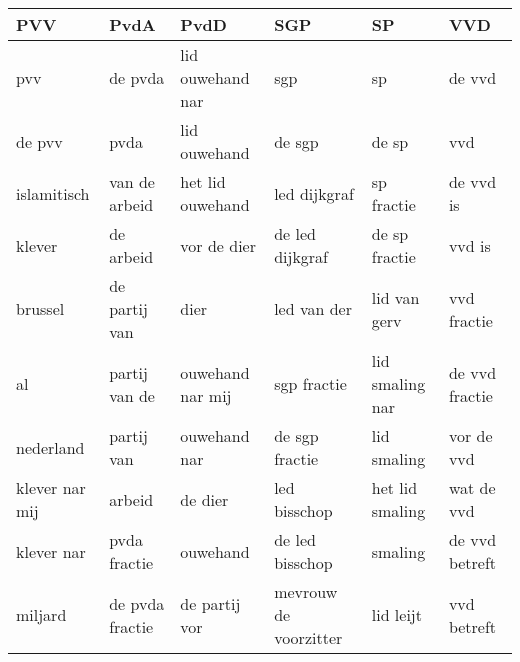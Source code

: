 \begin{tabular}{llllll}
\toprule
            PVV &             PvdA &              PvdD &                    SGP &               SP &             VVD \\
\midrule
            pvv &          de pvda &  lid ouwehand nar &                    sgp &               sp &          de vvd \\
         de pvv &             pvda &      lid ouwehand &                 de sgp &            de sp &             vvd \\
    islamitisch &    van de arbeid &  het lid ouwehand &           led dijkgraf &       sp fractie &       de vvd is \\
         klever &        de arbeid &       vor de dier &        de led dijkgraf &    de sp fractie &          vvd is \\
        brussel &    de partij van &              dier &            led van der &     lid van gerv &     vvd fractie \\
             al &    partij van de &  ouwehand nar mij &            sgp fractie &  lid smaling nar &  de vvd fractie \\
      nederland &       partij van &      ouwehand nar &         de sgp fractie &      lid smaling &      vor de vvd \\
 klever nar mij &           arbeid &           de dier &           led bisschop &  het lid smaling &      wat de vvd \\
     klever nar &     pvda fractie &          ouwehand &        de led bisschop &          smaling &  de vvd betreft \\
        miljard &  de pvda fractie &     de partij vor &  mevrouw de voorzitter &        lid leijt &     vvd betreft \\
\bottomrule
\end{tabular}
